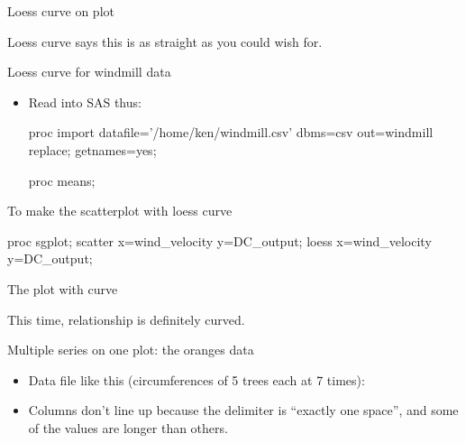 \documentclass[unknownkeysallowed]{beamer}\usepackage[]{graphicx}\usepackage[]{color}
\begin{document}
\begin{frame}[fragile]{Loess curve on plot}
  
  
  Loess curve says this is as straight as you could wish for.
\end{frame}

\begin{frame}[fragile]{Loess curve for windmill data}
  
  \begin{itemize}
  \item Read into SAS thus:
    
  \begin{Datastep}
proc import
  datafile='/home/ken/windmill.csv'
    dbms=csv
    out=windmill
    replace;
  getnames=yes;
  \end{Datastep}
  
  \begin{Sascode}[store=ng]
proc means;    
  \end{Sascode}
  
    
  \end{itemize}
  
\end{frame}

\begin{frame}[fragile]{To make the scatterplot with loess curve}
  
\begin{Sascode}[store=mje]
proc sgplot;
  scatter x=wind_velocity y=DC_output;
  loess x=wind_velocity y=DC_output;
\end{Sascode}
  
  
\end{frame}

\begin{frame}[fragile]{The plot with curve}
  
  
  This time, relationship is definitely curved.
  
\end{frame}


\begin{frame}[fragile]{Multiple series on one plot: the oranges data}

  \begin{itemize}
  \item Data file like this (circumferences of 5 trees each at 7
    times):
    


\item Columns don't line up because the delimiter is ``exactly one
  space'', and some of the values are longer than others.
  \end{itemize}
  
\end{frame}
\end{document}
